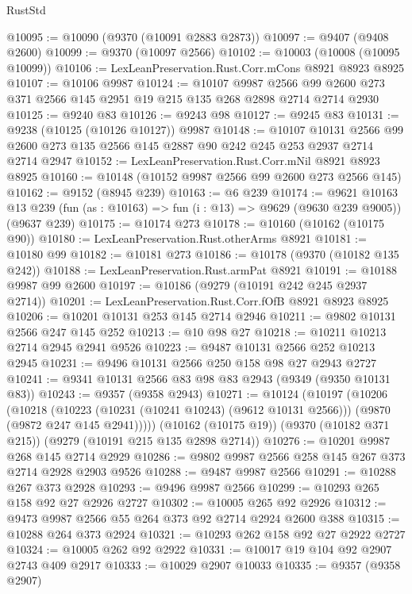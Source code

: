 \begin{lexlean}{RustStd}
\begin{coremodule}
{\begin{coremodule}
{{{{{{{{{{{{{{{{{{{{{{{{{{{{{{{{{{{{{{{@10095 := @10090 (@9370 (@10091 @2883 @2873))
@10097 := @9407 (@9408 @2600)
@10099 := @9370 (@10097 @2566)
@10102 := @10003 (@10008 (@10095 @10099))
@10106 := LexLeanPreservation.Rust.Corr.mCons @8921 @8923 @8925
@10107 := @10106 @9987
@10124 := @10107
    @9987
    @2566
    @99
    @2600
    @273
    @371
    @2566
    @145
    @2951
    @19
    @215
    @135
    @268
    @2898
    @2714
    @2714
    @2930
@10125 := @9240 @83
@10126 := @9243 @98
@10127 := @9245 @83
@10131 := @9238 (@10125 (@10126 @10127)) @9987
@10148 := @10107
    @10131
    @2566
    @99
    @2600
    @273
    @135
    @2566
    @145
    @2887
    @90
    @242
    @245
    @253
    @2937
    @2714
    @2714
    @2947
@10152 := LexLeanPreservation.Rust.Corr.mNil @8921 @8923 @8925
@10160 := @10148 (@10152 @9987 @2566 @99 @2600 @273 @2566 @145)
@10162 := @9152 (@8945 @239)
@10163 := @6 @239
@10174 := @9621
    @10163
    @13
    @239
    (fun (as : @10163) => fun (i : @13) => @9629 (@9630 @239 @9005))
    (@9637 @239)
@10175 := @10174 @273
@10178 := @10160 (@10162 (@10175 @90))
@10180 := LexLeanPreservation.Rust.otherArms @8921
@10181 := @10180 @99
@10182 := @10181 @273
@10186 := @10178 (@9370 (@10182 @135 @242))
@10188 := LexLeanPreservation.Rust.armPat @8921
@10191 := @10188 @9987 @99 @2600
@10197 := @10186 (@9279 (@10191 @242 @245 @2937 @2714))
@10201 := LexLeanPreservation.Rust.Corr.fOfB @8921 @8923 @8925
@10206 := @10201 @10131 @253 @145 @2714 @2946
@10211 := @9802 @10131 @2566 @247 @145 @252
@10213 := @10 @98 @27
@10218 := @10211 @10213 @2714 @2945 @2941 @9526
@10223 := @9487 @10131 @2566 @252 @10213 @2945
@10231 := @9496 @10131 @2566 @250 @158 @98 @27 @2943 @2727
@10241 := @9341 @10131 @2566 @83 @98 @83 @2943 (@9349 (@9350 @10131 @83))
@10243 := @9357 (@9358 @2943)
@10271 := @10124
    (@10197
      (@10206
        (@10218
          (@10223 (@10231 (@10241 @10243) (@9612 @10131 @2566)))
          (@9870 (@9872 @247 @145 @2941)))))
    (@10162 (@10175 @19))
    (@9370 (@10182 @371 @215))
    (@9279 (@10191 @215 @135 @2898 @2714))
@10276 := @10201 @9987 @268 @145 @2714 @2929
@10286 := @9802 @9987 @2566 @258 @145 @267 @373 @2714 @2928 @2903 @9526
@10288 := @9487 @9987 @2566
@10291 := @10288 @267 @373 @2928
@10293 := @9496 @9987 @2566
@10299 := @10293 @265 @158 @92 @27 @2926 @2727
@10302 := @10005 @265 @92 @2926
@10312 := @9473 @9987 @2566 @55 @264 @373 @92 @2714 @2924 @2600 @388
@10315 := @10288 @264 @373 @2924
@10321 := @10293 @262 @158 @92 @27 @2922 @2727
@10324 := @10005 @262 @92 @2922
@10331 := @10017 @19 @104 @92 @2907 @2743 @409 @2917
@10333 := @10029 @2907 @10033
@10335 := @9357 (@9358 @2907)
}}}}}}}}}}}}}}}}}}}}}}}}}}}}}}}}}}}}}}}
\end{coremodule}}
\end{coremodule}
\end{lexlean}

